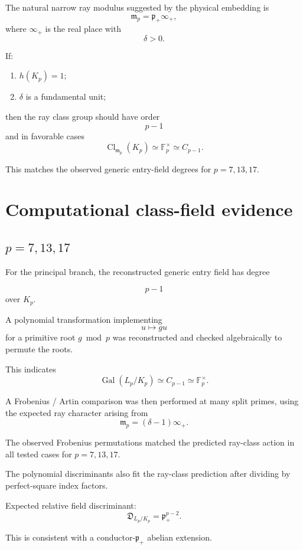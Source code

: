 \documentclass[11pt,reqno]{amsart}
\theoremstyle{plain}
\begin{document}
The natural narrow ray modulus suggested by the physical embedding is
\[
\boxed{
\mathfrak m_p=\mathfrak p_+\infty_+,
}
\]
where \(\infty_+\) is the real place with
\[
\delta>0.
\]

If:

\begin{enumerate}
\item \(h(K_p)=1\);
\item \(\delta\) is a fundamental unit;
\end{enumerate}

then the ray class group should have order
\[
p-1
\]
and in favorable cases
\[
\operatorname{Cl}_{\mathfrak m_p}(K_p)
\simeq
\mathbb F_p^\times
\simeq
C_{p-1}.
\]

This matches the observed generic entry-field degrees for \(p=7,13,17\).

\section{Computational class-field evidence}\label{sec:8}

\subsection{\texorpdfstring{\(p=7,13,17\)}{p=7,13,17}}\label{sec:8.1}

For the principal branch, the reconstructed generic entry field has degree

\[
p-1
\]
over \(K_p\).

A polynomial transformation implementing
\[
u\mapsto gu
\]
for a primitive root \(g\bmod p\) was reconstructed and checked algebraically to permute the roots.

This indicates
\[
\operatorname{Gal}(L_p/K_p)
\simeq
C_{p-1}
\simeq
\mathbb F_p^\times.
\]

A Frobenius / Artin comparison was then performed at many split primes, using the expected ray character arising from
\[
\mathfrak m_p=(\delta-1)\infty_+.
\]

The observed Frobenius permutations matched the predicted ray-class action in all tested cases for \(p=7,13,17\).

The polynomial discriminants also fit the ray-class prediction after dividing by perfect-square index factors.

Expected relative field discriminant:
\[
\boxed{
\mathfrak D_{L_p/K_p}
=
\mathfrak p_+^{p-2}.
}
\]

This is consistent with a conductor-\(\mathfrak p_+\) abelian extension.
\end{document}

